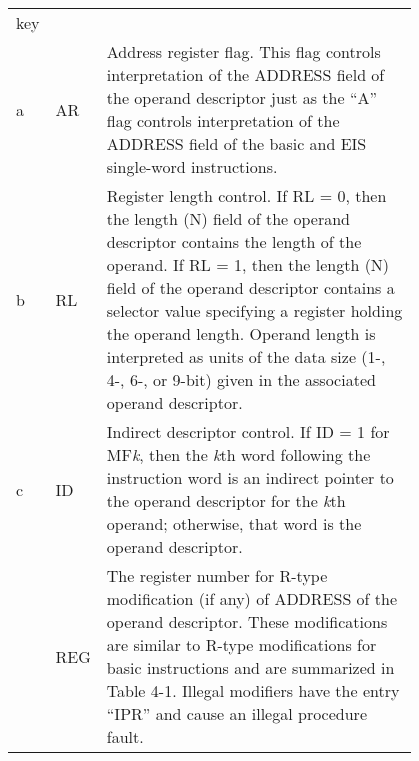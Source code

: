 {\begin{tabular}{l l p{0.8\linewidth}}
key & & \\
a & AR &
Address register flag. This flag controls interpretation of the ADDRESS field
of the operand descriptor just as the {``}A'' flag controls interpretation of the
ADDRESS field of the basic and EIS single-word instructions. \\
b & RL &
Register length control. If RL = 0, then the length (N) field of the operand
descriptor contains the length of the operand. If RL = 1, then the length (N)
field of the operand descriptor contains a selector value specifying a register
holding the operand length. Operand length is interpreted as units of the data
size (1-, 4-, 6-, or 9-bit) given in the associated operand descriptor. \\
c & ID &
Indirect descriptor control. If ID = 1 for MF\textsl{k}, then the \textsl{k}th word following the
instruction word is an indirect pointer to the operand descriptor for the \textsl{k}th
operand; otherwise, that word is the operand descriptor.  \\
 & REG &
The register number for R-type modification (if any) of ADDRESS of the
operand descriptor. These modifications are similar to R-type modifications
for basic instructions and are summarized in Table 4-1. Illegal modifiers have
the entry {``}IPR'' and cause an illegal procedure fault.

\end{tabular}


}
